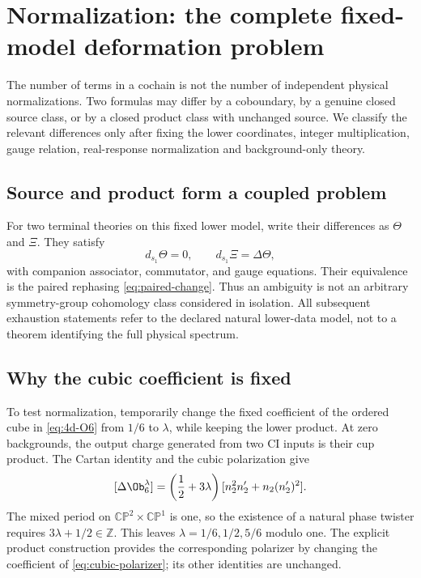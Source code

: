 \section{Normalization: the complete fixed-model deformation problem}\label{sec:normalization}\label{sec:freedom04}\label{sec:denominator05}\label{sec:product05}
The number of terms in a cochain is not the number of independent physical normalizations. Two formulas may differ by a coboundary, by a genuine closed source class, or by a closed product class with unchanged source. We classify the relevant differences only after fixing the lower coordinates, integer multiplication, gauge relation, real-response normalization and background-only theory.

\subsection{Source and product form a coupled problem}
For two terminal theories on this fixed lower model, write their differences as $\Theta$ and $\Xi$. They satisfy
\begin{equation}\label{eq:deformation-equations}
 d_{s_1}\Theta=0,\qquad d_{s_1}\Xi=\Delta\Theta,
\end{equation}
with companion associator, commutator, and gauge equations. Their equivalence is the paired rephasing \eqref{eq:paired-change}. Thus an ambiguity is not an arbitrary symmetry-group cohomology class considered in isolation. All subsequent exhaustion statements refer to the declared natural lower-data model, not to a theorem identifying the full physical spectrum.

\subsection{Why the cubic coefficient is fixed}\label{subsec:cubic-product}\label{subsec:cubic-parity}
To test normalization, temporarily change the fixed coefficient of the ordered cube in \eqref{eq:4d-O6} from $1/6$ to $\lambda$, while keeping the lower product. At zero backgrounds, the output charge generated from two CI inputs is their cup product. The Cartan identity and the cubic polarization give
\begin{equation}\label{eq:cubic-primitivity}
 [\Delta\Ob_6^{\lambda}]
 =\left(\frac12+3\lambda\right)
   [n_2^2n'_2+n_2(n'_2)^2].
\end{equation}
The mixed period on $\mathbb{CP}^2\times\mathbb{CP}^1$ is one, so the existence of a natural phase twister requires $3\lambda+1/2\in\mathbb Z$. This leaves $\lambda=1/6,1/2,5/6$ modulo one. The explicit product construction provides the corresponding polarizer by changing the coefficient of \eqref{eq:cubic-polarizer}; its other identities are unchanged.

